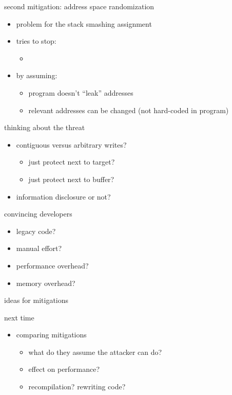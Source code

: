 \begin{frame}{second mitigation: address space randomization}
    \begin{itemize}
    \item problem for the stack smashing assignment
    \item tries to stop:
        \begin{itemize}
        \item {} \\
        \end{itemize}
    \item by assuming:
        \begin{itemize}
        \item program doesn't ``leak'' addresses
        \item relevant addresses can be changed (not hard-coded in program)
        \end{itemize}
    \end{itemize}
\end{frame}

\begin{frame}{thinking about the threat}
    \begin{itemize}
        \item contiguous versus arbitrary writes?
            \begin{itemize}
            \item just protect next to target?
            \item just protect next to buffer?
            \end{itemize}
        \item information disclosure or not?
    \end{itemize}
\end{frame}

\begin{frame}{convincing developers}
    \begin{itemize}
        \item legacy code?
        \item manual effort?
        \item performance overhead?
        \item memory overhead?
    \end{itemize}
\end{frame}

\begin{frame}{ideas for mitigations}
\end{frame}

\begin{frame}{next time}
    \begin{itemize}
    \item comparing mitigations
        \begin{itemize}
        \item what do they assume the attacker can do?
        \item effect on performance?
        \item recompilation? rewriting code?
        \end{itemize}
    \end{itemize}
\end{frame}
